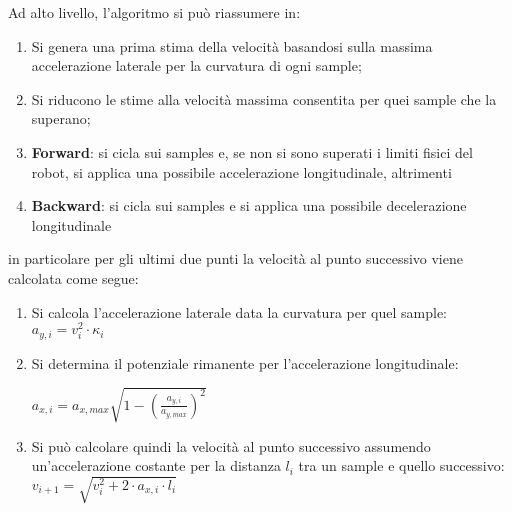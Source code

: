 Ad alto livello, l'algoritmo si può riassumere in:
\begin{enumerate}
	\item Si genera una prima stima della velocità basandosi sulla massima accelerazione laterale per la
	      curvatura di ogni sample;
	\item Si riducono le stime alla velocità massima consentita per quei sample che la superano;
	\item \textbf{Forward}: si cicla sui samples e, se non si sono superati i limiti fisici del robot, si
		applica una possibile accelerazione longitudinale, altrimenti
	\item \textbf{Backward}: si cicla sui samples e si applica una possibile decelerazione longitudinale
\end{enumerate}
in particolare per gli ultimi due punti la velocità al punto successivo viene calcolata come segue:
\begin{enumerate}

	\item \raggedright Si calcola l'accelerazione laterale data la curvatura per quel sample:\\
	      \centering $a_{y,i} = v_i^2 \cdot \kappa_i$ 

	\raggedright
	\item Si determina il potenziale rimanente per l'accelerazione longitudinale:\\
	      \begin{center}
			  $a_{x,i} = a_{x,max} \sqrt{\displaystyle 1- \left(\frac{a_{y,i}}{a_{y,max}}\right)^2}$
		  \end{center}

	\item Si può calcolare quindi la velocità al punto successivo assumendo un'accelerazione costante per
		la distanza $l_i$ tra un sample e quello successivo:\\
		\centering $v_{i+1} = \sqrt{v_i^2 + 2 \cdot a_{x,i} \cdot l_i}$
\end{enumerate}
